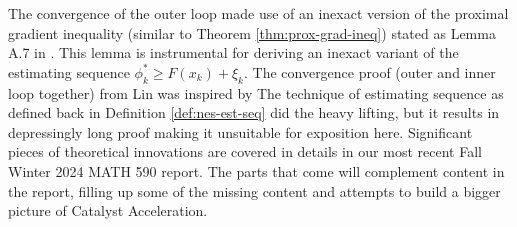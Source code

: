 \documentclass[12pt]{article}
\begin{document}
            The convergence of the outer loop made use of an inexact version of the proximal gradient inequality (similar to Theorem \ref{thm:prox-grad-ineq}) stated as Lemma A.7 in \cite{lin_universal_2015}. 
            This lemma is instrumental for deriving an inexact variant of the estimating sequence $\phi_k^* \ge F(x_k) + \xi_k$. 
            The convergence proof (outer and inner loop together) from Lin was inspired by 
            The technique of estimating sequence as defined back in Definition \ref{def:nes-est-seq} did the heavy lifting, but it results in depressingly long proof making it unsuitable for exposition here. 
            Significant pieces of theoretical innovations are covered in details in our most recent Fall Winter 2024 MATH 590 report. 
            The parts that come will complement content in the report, filling up some of the missing content and attempts to build a bigger picture of Catalyst Acceleration. 
\end{document}
